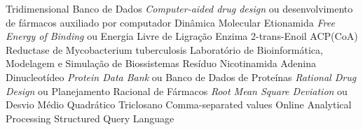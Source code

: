 \documentclass[portuguese,twoside]{pucrs-ppgcc}
\begin{document}
\begin{abstract}{lorem, ipsum, dolor, sit, amet}
Your abstract in English here. lorem ipsum dolor sit amet
consetetur sadipscing elitr sed diam nonumy eirmod tempor invidunt
ut labore et dolore magna aliquyam erat sed diam voluptua at vero
eos et accusam et justo duo dolores et ea rebum stet clita kasd
gubergren no sea takimata sanctus est lorem ipsum dolor sit amet
lorem ipsum dolor sit amet consetetur sadipscing elitr sed diam
nonumy eirmod tempor invidunt ut labore et dolore magna aliquyam
erat sed diam voluptua at
\end{abstract}

\listoffigures       %
\listoftables        %
\listofacronyms      %
\tableofcontents     %


		{Tridimensional}
		{Banco de Dados}
	{\emph{Computer-aided drug design} ou desenvolvimento de fármacos auxiliado por computador}
		{Dinâmica Molecular}
		{Etionamida}
		{\emph{Free Energy of Binding} ou Energia Livre de Ligração}
	{Enzima 2-trans-Enoil ACP(CoA) Reductase de Mycobacterium tuberculosis }
	{Laboratório de Bioinformática, Modelagem e Simulação de Biossistemas}
	{Resíduo Nicotinamida Adenina Dinucleotídeo}
		{\emph{Protein Data Bank} ou Banco de Dados de Proteínas}
		{\emph{Rational Drug Design} ou Planejamento Racional de Fármacos}
	{\emph{Root Mean Square Deviation} ou Desvio Médio Quadrático}
 	{Triclosano}
 	{Comma-separated values}
 	{Online Analytical Processing}
 	{Structured Query Language}











\end{document}
